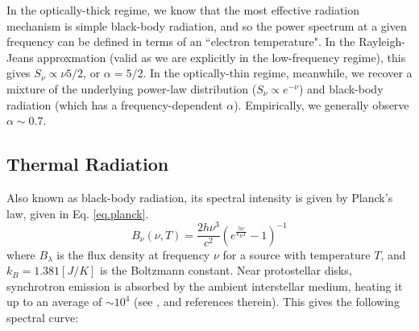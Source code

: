 \pg
In the optically-thick regime, we know that the most effective radiation mechanism is simple black-body radiation, and so the power spectrum at a given frequency can be defined in terms of an ``electron temperature". In the Rayleigh-Jeans approxmation (valid as we are explicitly in the low-frequency regime), this gives $S_\nu \propto \nu{5/2}$, or $\alpha=5/2$. 
In the optically-thin regime, meanwhile, we recover a mixture of the underlying power-law distribution ($S_\nu \propto e^{-\nu}$) and black-body radiation (which has a frequency-dependent $\alpha$). Empirically, we generally observe $\alpha \sim 0.7$.


\subsection{Thermal Radiation}
\pg
Also known as black-body radiation, its spectral intensity is given by Planck's law, given in Eq. \ref{eq.planck}.
\begin{equation}\label{eq.planck}
B_\nu(\nu,T) = \frac{2h\nu^3}{c^2}\left(e^\frac{h\nu}{k_BT}-1\right)^{-1}
\end{equation}
where $B_\lambda$ is the flux density at frequency $\nu$ for a source with temperature $T$, and $k_B=1.381 \left[J/K\right]$ is the Boltzmann constant. Near protostellar disks, synchrotron emission is absorbed by the ambient interstellar medium, heating it up to an average of $\sim 10^4$ (see ,  and references therein). This gives the following spectral curve:

